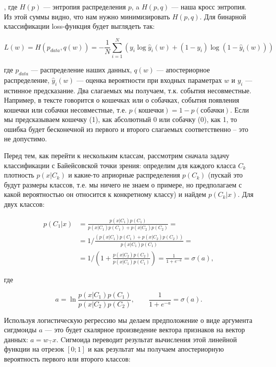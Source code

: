 , где $H(p)$ ---  энтропия распределения $p$, a $H(p, q)$ --- наша кросс энтропия. Из этой суммы видно, что
нам нужно минимизировать $H(p, q)$. Для бинарной классификации loss-функция будет выглядеть так:

\begin{equation} \label{eq:logLoss}
 L(w)= H(p_{data}, q(w)) = -\frac{1}{N}\sum_{i=1}^N(y_i\log\hat y_i(w) + (1-y_i)\log(1-\hat y_i(w)))
\end{equation}

где $p_{data}$ --- распределение наших данных, $q(w)$ --- апостериорное распределение,  $\hat y_i(w)$ ---
оценка вероятности при входных параметрах $w$ и $y_i$ --- истинное предсказание. Два слагаемых мы получаем,
т.к. события несовместные. Например, в тексте говорится о кошечках или о собачках, события появления кошечки
или собачки несовместные, т.е. $p(\text{кошечки}) = 1 - p(\text{собачки})$. Если мы предсказываем кошечку (1),
как абсолютный 0 или собачку (0), как 1, то ошибка будет бесконечной из первого и второго слагаемых
соответственно -- это не допустимо.

Перед тем, как перейти к нескольким классам, рассмотрим сначала задачу классификации с Байейсовской точки
зрения: определим для каждого класса $C_k$ плотность $p(x|C_k)$ и какие-то априорные распределения $p(C_k)$
(пускай это будут размеры классов, т.е. мы ничего не знаем о примере, но предполагаем с какой вероятностью он
относится к конкретному классу) и найдем $p(C_k|x)$. Для двух классов:

\begin{equation}
\begin{aligned}
 p(C_1|x) & = \frac{p(x|C_1)p(C_1)}{p(x|C_1)p(C_1)+p(x|C_2)p(C_2)} = \\
 & = 1/\frac{(p(x|C_1)p(C_1)+p(x|C_2)p(C_2))}{p(x|C_1)p(C_1)} = \\
 & = 1/(1+\frac{p(x|C_2)p(C_2)}{p(x|C_1)p(C_1)}) = \frac{1}{1+e^{-a}} = \sigma (a),
\end{aligned}
\end{equation}

где

\begin{equation}
 a = \ln\frac{p(x|C_1)p(C_1)}{p(x|C_2)p(C_2)},\qquad \frac{1}{1+e^{-a}} = \sigma (a).
\end{equation}

Используя логистическую регрессию мы делаем предположение о виде аргумента сигдмоиды $a$ --- это будет
скалярное произведение вектора признаков на вектор данных: $a = w_\top x$. Cигмоида переводит результат
вычисления этой линейной функции на отрезок $[0;1]$ и как результат мы получаем апостериорную вероятность
первого или второго классов:

